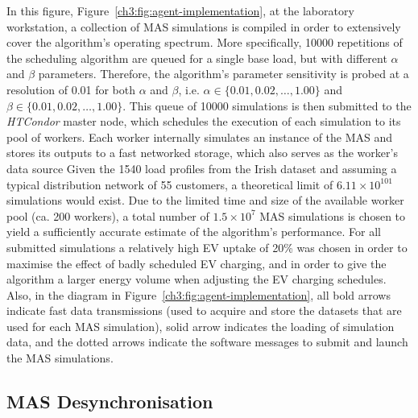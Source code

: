 In this figure, Figure~\ref{ch3:fig:agent-implementation}, at the laboratory workstation, a collection of MAS simulations is compiled in order to extensively cover the algorithm's operating spectrum.
More specifically, 10000 repetitions of the scheduling algorithm are queued for a single base load, but with different $\alpha$ and $\beta$ parameters.
Therefore, the algorithm's parameter sensitivity is probed at a resolution of 0.01 for both $\alpha$ and $\beta$, i.e. $\alpha \in \{0.01, 0.02, \dots, 1.00\}$ and $\beta \in \{0.01, 0.02, \dots, 1.00\}$.
This queue of 10000 simulations is then submitted to the \textit{HTCondor} master node, which schedules the execution of each simulation to its pool of workers.
Each worker internally simulates an instance of the MAS and stores its outputs to a fast networked storage, which also serves as the worker's data source
Given the 1540 load profiles from the Irish dataset and assuming a typical distribution network of 55 customers, a theoretical limit of $6.11\times10^{101}$ simulations would exist.
Due to the limited time and size of the available worker pool (ca. 200 workers), a total number of $1.5\times10^{7}$ MAS simulations is chosen to yield a sufficiently accurate estimate of the algorithm's performance.
For all submitted simulations a relatively high EV uptake of 20\% was chosen in order to maximise the effect of badly scheduled EV charging, and in order to give the algorithm a larger energy volume when adjusting the EV charging schedules.
Also, in the diagram in Figure~\ref{ch3:fig:agent-implementation}, all bold arrows indicate fast data transmissions (used to acquire and store the datasets that are used for each MAS simulation), solid arrow indicates the loading of simulation data, and the dotted arrows indicate the software messages to submit and launch the MAS simulations.

\subsection{MAS Desynchronisation}
\label{ch3:subsec:desynchronisation}

